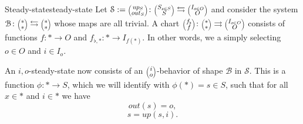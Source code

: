 \documentclass[12pt, a4paper]{article}
\theoremstyle{definition}
\theoremstyle{plain}
\theoremstyle{plain}
\theoremstyle{plain}
\theoremstyle{plain}
\theoremstyle{plain}
\theoremstyle{remark}
\theoremstyle{remark}
\newcommand{\mc}[1]{\mathcal{#1}}
\newcommand{\lens}[2]{\scaleobj{0.6}{\begin{pmatrix} \scaleobj{1.3}{{#1}} \\ \scaleobj{1.3}{{#2}} \end{pmatrix}}}
\begin{document}
\begin{tcdefinition}{Steady-state}{steady-state}
	Let $\mc{S} := \lens{up_S}{out_S} \colon \lens{S_{s \in S}}{S} \leftrightarrows \lens{I_{o \in O}}{O}$ and consider the system $\mc{B} \colon \lens{*}{*} \leftrightarrows \lens{*}{*}$ whose maps are all trivial. A chart $\lens{f_\flat}{f} \colon \lens{*}{*} \rightrightarrows \lens{I_{o \in O}}{O}$ consists of functions $f \colon * \rightarrow O$ and $f_{\flat,*} \colon * \rightarrow I_{f(*)}$. In other words, we a simply selecting $o \in O$ and $i \in I_o$. 

	An $i,o$-steady-state now consists of an $\lens{i}{o}$-behavior of shape $\mc{B}$ in $\mc{S}$. This is a function $\phi \colon * \rightarrow S$, which we will identify with $\phi(*) = s \in S$, such that for all $x \in *$ and $i \in *$ we have
	$$out(s) = o, $$
	$$s = up(s,i).$$
\end{tcdefinition}
\end{document}
